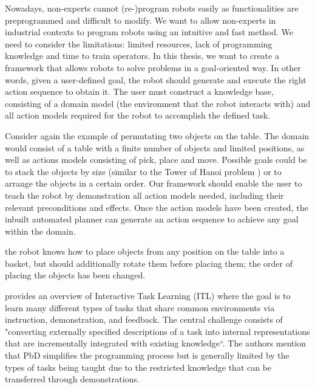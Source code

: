 Nowadays, non-experts cannot (re-)program robots easily as functionalities are preprogrammed and difficult to modify.
We want to allow non-experts in industrial contexts to program robots using an intuitive and fast method.
We need to consider the limitations: limited resources, lack of programming knowledge and time to train operators.
In this thesis, we want to create a framework that allows robots to solve problems in a goal-oriented way.
In other words, given a user-defined goal, the robot should generate and execute the right action sequence to obtain it.
The user must construct a knowledge base, consisting of a domain model (the environment that the robot interacts with) and all action models required for the robot to accomplish the defined task.

Consider again the example of permutating two objects on the table.
The domain would consist of a table with a finite number of objects and limited positions, as well as actions models consisting of pick, place and move. Possible goals could be to stack the objects by size (similar to the Tower of Hanoi problem \cite{douglas1985metamagical}) or to arrange the objects in a certain order. Our framework should enable the user to teach the robot by demonstration all action models needed, including their relevant preconditions and effects. Once the action models have been created, the inbuilt automated planner can generate an action sequence to achieve any goal within the domain. 

the robot knows how to place objects from any position on the table into a basket, but should additionally rotate them before placing them;
the order of placing the objects has been changed.

\cite{laird2017interactive} provides an overview of Interactive Task Learning (ITL) where the goal is to learn many different types of tasks that share common environments via instruction, demonstration, and feedback. 
The central challenge consists of "converting externally specified descriptions of a task into internal representations that are incrementally integrated with existing knowledge``.
The authors mention that PbD simplifies the programming process but is generally limited by the types of tasks being taught due to the restricted knowledge that can be transferred through demonstrations.

